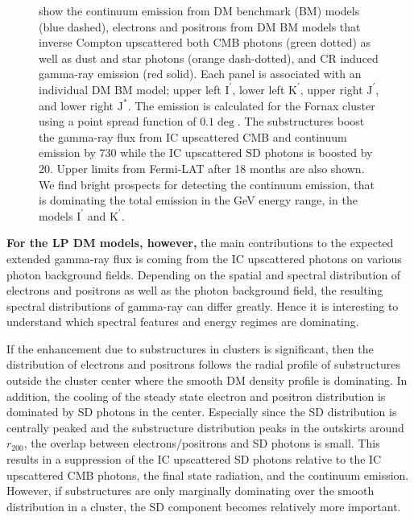 \documentclass[10pt,aps,pra,reprint,amsmath,amsfonts,amssymb,showpacs,nofootinbib,floatfix]{revtex4-1}
\def\del#1{{}}
\def\C#1{{\bf #1}}
\newcommand{\rmn}{\mathrm}
\newcommand{\Kp}{\rmn{K}^\prime}
\newcommand{\Ip}{\rmn{I}^\prime}
\newcommand{\Js}{\rmn{J}^*}
\newcommand{\Jp}{\rmn{J}^\prime}
\newcommand{\rvir}{r_{200}}
\begin{document}
\begin{figure}
\begin{minipage}{2.0\columnwidth}
{  show the continuum emission from DM benchmark (BM) models (blue
  dashed), electrons and positrons from DM BM models that inverse
  Compton upscattered both CMB photons (green dotted) as well as dust
  and star photons (orange dash-dotted), and CR induced gamma-ray
  emission (red solid). Each panel is associated with an individual DM
  BM model; upper left $\Ip$, lower left $\Kp$, upper right $\Jp$, and
  lower right $\Js$. The emission is calculated for the Fornax cluster
  using a point spread function of $0.1\deg$. The substructures boost
  the gamma-ray flux from IC upscattered CMB and continuum emission by
  730 while the IC upscattered SD photons is boosted by 20. Upper
  limits from Fermi-LAT after 18 months \protect
  \cite{2010ApJ...717L..71A} are also shown. We find bright prospects
  for detecting the continuum emission, that is dominating the total
  emission in the GeV energy range, in the models $\Ip$ and $\Kp$.}
 \label{fig:diff_BM}
\end{minipage}
\end{figure}

\C{For the LP DM models, however,}\del{One of} the main contributions
to the expected extended gamma-ray flux is coming from the IC
upscattered photons on various photon background fields. Depending on
the spatial and spectral distribution of electrons and positrons as
well as the photon background field, the resulting spectral
distributions of gamma-ray can differ greatly. Hence it is interesting
to understand which spectral features and energy regimes are
dominating.\del{for the different DM models.}

If the enhancement due to substructures in clusters is significant,
then the distribution of electrons and positrons follows the radial
profile of substructures outside the cluster center where the smooth
DM density profile is dominating. In addition, the cooling of the
steady state electron and positron distribution is dominated by SD
photons in the center. Especially since the SD distribution is
centrally peaked and the substructure distribution peaks in the
outskirts around $\rvir$, the overlap between electrons/positrons and
SD photons is small. This results in a suppression of the IC
upscattered SD photons relative to the IC upscattered CMB photons, the
final state radiation, and the continuum emission. However, if
substructures are only marginally dominating over the smooth
distribution in a cluster, the SD component becomes relatively more
important.
\end{document}
